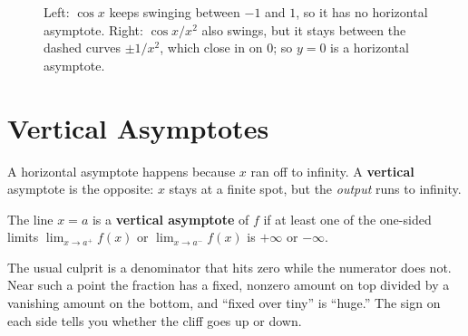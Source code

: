 \begin{figure}[htbp]
\centering
{}
\caption{Left: $\cos x$ keeps swinging between $-1$ and $1$, so it has no
horizontal asymptote. Right: $\cos x/x^2$ also swings, but it stays between
the dashed curves $\pm 1/x^2$, which close in on $0$; so $y=0$ is a
horizontal asymptote.}
\label{ch09:fig-cos-squeeze}
\end{figure}

\section{Vertical Asymptotes}
\label{ch09:vertical}

A horizontal asymptote happens because $x$ ran off to infinity. A
\textbf{vertical} asymptote is the opposite: $x$ stays at a finite spot, but the
\emph{output} runs to infinity.

\begin{definition}
\label{ch09:def-va}
The line $x=a$ is a \textbf{vertical asymptote} of $f$ if at least one of the
one-sided limits $\lim_{x\to a^+} f(x)$ or $\lim_{x\to a^-} f(x)$ is $+\infty$
or $-\infty$.
\end{definition}

The usual culprit is a denominator that hits zero while the numerator does not.
Near such a point the fraction has a fixed, nonzero amount on top divided by a
vanishing amount on the bottom, and ``fixed over tiny'' is ``huge.'' The sign on
each side tells you whether the cliff goes up or down.

